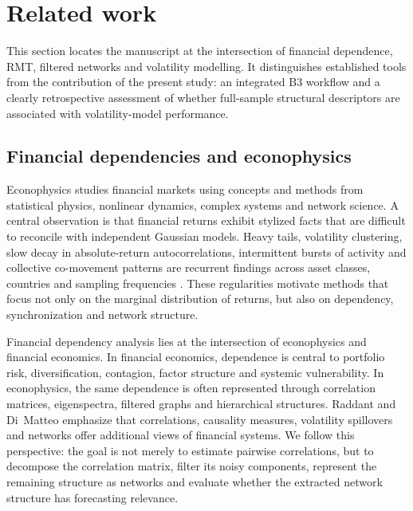 \section{Related work}
\label{sec:related_work}

This section locates the manuscript at the intersection of financial dependence, RMT, filtered networks and volatility modelling. It distinguishes established tools from the contribution of the present study: an integrated B3 workflow and a clearly retrospective assessment of whether full-sample structural descriptors are associated with volatility-model performance.

\subsection{Financial dependencies and econophysics}

Econophysics studies financial markets using concepts and methods from statistical physics, nonlinear dynamics, complex systems and network science. A central observation is that financial returns exhibit stylized facts that are difficult to reconcile with independent Gaussian models. Heavy tails, volatility clustering, slow decay in absolute-return autocorrelations, intermittent bursts of activity and collective co-movement patterns are recurrent findings across asset classes, countries and sampling frequencies \cite{mantegna_stanley_1999_book,cont_2001_empirical}. These regularities motivate methods that focus not only on the marginal distribution of returns, but also on dependency, synchronization and network structure.

Financial dependency analysis lies at the intersection of econophysics and financial economics. In financial economics, dependence is central to portfolio risk, diversification, contagion, factor structure and systemic vulnerability. In econophysics, the same dependence is often represented through correlation matrices, eigenspectra, filtered graphs and hierarchical structures. Raddant and Di~Matteo \cite{raddant_dimatteo_2023} emphasize that correlations, causality measures, volatility spillovers and networks offer additional views of financial systems. We follow this perspective: the goal is not merely to estimate pairwise correlations, but to decompose the correlation matrix, filter its noisy components, represent the remaining structure as networks and evaluate whether the extracted network structure has forecasting relevance.

